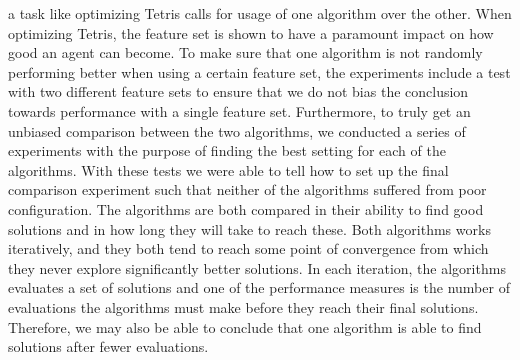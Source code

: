 a task like optimizing Tetris calls for usage of one algorithm over the other.
When optimizing Tetris, the feature set is shown to have a paramount impact on
how good an agent can become. To make sure that one algorithm is not randomly performing
better when using a certain feature set, the experiments include a test with two different 
feature sets to ensure that we do not bias the conclusion towards performance with a 
single feature set. Furthermore, to truly get an unbiased comparison between the two 
algorithms, we conducted a series of experiments with the purpose of finding
the best setting for each of the algorithms. With these tests we were able to 
tell how to set up the final comparison experiment such that neither of the
algorithms suffered from poor configuration. The algorithms are both 
compared in their ability to find good solutions and in how long they will 
take to reach these. Both algorithms works iteratively, and they both tend to
reach some point of convergence from which they never explore significantly better 
solutions. In each iteration, the algorithms evaluates a set of solutions and one of the
performance measures is the number of evaluations the algorithms must make 
before they reach their final solutions. Therefore, we may also be able to conclude 
that one algorithm is able to find solutions after fewer evaluations.




